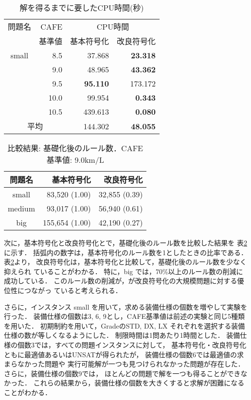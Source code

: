 \begin{table}[tbp]
 \caption{解を得るまでに要したCPU時間(秒)}
 \centering
 \begin{tabular}{c|r|rr}\bhline
  問題名 & CAFE  & \multicolumn{2}{c}{CPU時間} \\ \cline{3-4}   
        & 基準値 & 基本符号化  & 改良符号化 \\ \hline
  small & 8.5  & 37.868          & \textbf{23.318}   \\
  	& 9.0  & 48.965          & \textbf{43.362}   \\
  	& 9.5  & \textbf{95.110} & 173.172           \\
  	& 10.0 & 99.954          & \textbf{0.343}    \\
  	& 10.5 & 439.613         & \textbf{0.080}    \\ \hline \hline
  \multicolumn{2}{c}{平均}  & 144.302         & \textbf{48.055}   \\ \hline
 \end{tabular}
 \label{tab:cpu_time}
\end{table}
\begin{table}[tb]
 \caption{比較結果: 基礎化後のルール数．CAFE基準値: 9.0km/L}
 \centering
 \begin{tabular}{crr} \bhline
  問題名    & 基本符号化    & 改良符号化    \\ \hline
  small	    &  83,520 (1.00)  & 32,855 (0.39) \\ 
  medium    &  93,017 (1.00)  & 56,940 (0.61) \\
  big	    & 155,654 (1.00)  & 42,190 (0.27) \\ \hline
 \end{tabular}
 \label{tab:rule}
\end{table}

次に，基本符号化と改良符号化とで，基礎化後のルール数を比較した結果を
表\ref{tab:rule}に示す．
括弧内の数字は，基本符号化のルール数を1としたときの比率である．
表\ref{tab:rule}より，
改良符号化は，基本符号化と比較して，基礎化後のルール数を少なく抑えられ
ていることがわかる．
特に，big では，70\%以上のルール数の削減に成功している．
このルール数の削減が，が改良符号化の大規模問題に対する優位性につながっ
ていると考えられる．

さらに，インスタンス small を用いて，求める装備仕様の個数を増やして実験を行った．
装備仕様の個数は3, 6, 9とし，CAFE基準値は前述の実験と同じ5種類を用いた．
初期制約を用いて，\textsf{Grade}の\textsf{STD, DX, LX}
それぞれを選択する装備仕様の数が等しくなるようにした．
制限時間は1問あたり1時間とした．
装備仕様の個数3では，すべての問題インスタンスに対して，
基本符号化・改良符号化ともに最適値あるいはUNSATが得られたが，
装備仕様の個数6では最適値の求まらなかった問題や
実行可能解が一つも見つけられなかった問題が存在した．
さらに，装備仕様の個数9では，
ほとんどの問題で解を一つも得ることができなかった．
これらの結果から，装備仕様の個数を大きくすると求解が困難になることがわかる．


